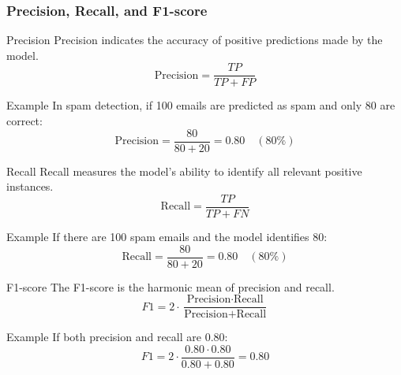 \documentclass{beamer}
\begin{document}
\begin{frame}[fragile]
    \frametitle{Precision, Recall, and F1-score}
    \begin{block}{Precision}
        Precision indicates the accuracy of positive predictions made by the model.
        \begin{equation}
            \text{Precision} = \frac{TP}{TP + FP}
        \end{equation}
        \begin{block}{Example}
            In spam detection, if 100 emails are predicted as spam and only 80 are correct:
            \[
            \text{Precision} = \frac{80}{80 + 20} = 0.80 \quad (80\%)
            \]
        \end{block}
    \end{block}

    \begin{block}{Recall}
        Recall measures the model's ability to identify all relevant positive instances.
        \begin{equation}
            \text{Recall} = \frac{TP}{TP + FN}
        \end{equation}
        \begin{block}{Example}
            If there are 100 spam emails and the model identifies 80:
            \[
            \text{Recall} = \frac{80}{80 + 20} = 0.80 \quad (80\%)
            \]
        \end{block}
    \end{block}

    \begin{block}{F1-score}
        The F1-score is the harmonic mean of precision and recall.
        \begin{equation}
            F1 = 2 \cdot \frac{\text{Precision} \cdot \text{Recall}}{\text{Precision} + \text{Recall}}
        \end{equation}
        \begin{block}{Example}
            If both precision and recall are 0.80:
            \[
            F1 = 2 \cdot \frac{0.80 \cdot 0.80}{0.80 + 0.80} = 0.80
            \]
        \end{block}
    \end{block}
\end{frame}
\end{document}
